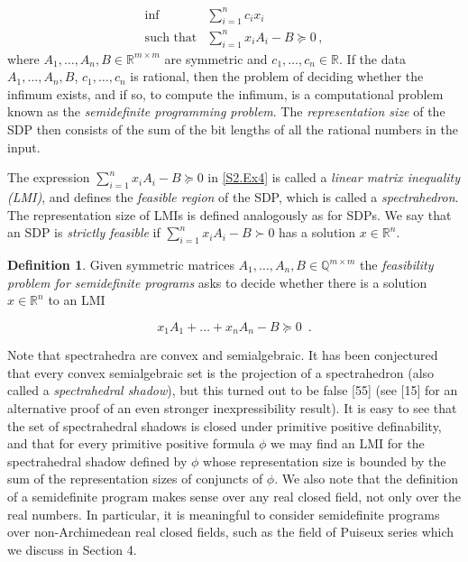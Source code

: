 \documentclass[10pt,a4paper]{article}
\theoremstyle{definition}
\newtheorem{definition}[theorem]{Definition}
\begin{document}
\begin{equation}\tag{P}\label{S2.Ex4}
\begin{aligned}
\displaystyle\inf & \displaystyle\sum_{i=1}^{n}c_{i}x_{i} \\
\text{such that} & \displaystyle\sum_{i=1}^{n}x_{i}A_{i}-B\succeq 0\,,
\end{aligned}
\end{equation}
where $A_{1},\dots,A_{n},B\in{\mathbb{R}}^{m\times m}$ are symmetric and $c_{1},\dots,c_{n}\in{\mathbb{R}}$. If the data $A_{1},\dots,A_{n},B$, $c_{1},\dots,c_{n}$ is rational, then the problem of deciding whether the infimum exists, and if so, to compute the infimum, is a computational problem known as the \emph{semidefinite programming problem}. The \emph{representation size} of the SDP then consists of the sum of the bit lengths of all the rational numbers in the input.

The expression $\sum_{i=1}^{n}x_{i}A_{i}-B\succeq 0$ in \eqref{S2.Ex4} is called a \emph{linear matrix inequality (LMI)}, and defines the \emph{feasible region} of the SDP, which is called a \emph{spectrahedron}. The representation size of LMIs is defined analogously as for SDPs. We say that an SDP is \emph{strictly feasible} if $\sum_{i=1}^{n}x_{i}A_{i}-B\succ 0$ has a solution $x\in{\mathbb{R}}^{n}$.

\setcounter{theorem}{0}
\begin{definition}\label{Thmtheorem1}
Given symmetric matrices $A_{1},\dots,A_{n},B\in{\mathbb{Q}}^{m\times m}$ the \emph{feasibility problem for semidefinite programs} asks to decide whether there is a solution $x\in\mathbb{R}^{n}$ to an LMI


\[
x_{1}A_{1}+\dots+x_{n}A_{n}-B\succeq 0\enspace.
\]
\end{definition}

Note that spectrahedra are convex and semialgebraic. It has been conjectured that every convex semialgebraic set is the projection of a spectrahedron (also called a \emph{spectrahedral shadow}), but this turned out to be false [55] (see [15] for an alternative proof of an even stronger inexpressibility result). It is easy to see that the set of spectrahedral shadows is closed under primitive positive definability, and that for every primitive positive formula $\phi$ we may find an LMI for the spectrahedral shadow defined by $\phi$ whose representation size is bounded by the sum of the representation sizes of conjuncts of $\phi$. We also note that the definition of a semidefinite program makes sense over any real closed field, not only over the real numbers. In particular, it is meaningful to consider semidefinite programs over non-Archimedean real closed fields, such as the field of Puiseux series which we discuss in Section 4.
\end{document}
